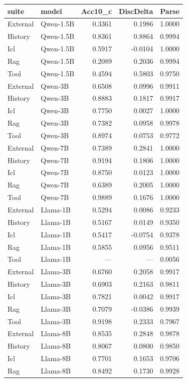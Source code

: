 \begin{tabular}{llrrr}
\toprule
suite & model & Acc10_c & DiscDelta & Parse \\
\midrule
External & Qwen-1.5B & 0.3361 & 0.1986 & 1.0000 \\
History & Qwen-1.5B & 0.8361 & 0.8864 & 0.9994 \\
Icl & Qwen-1.5B & 0.5917 & -0.0104 & 1.0000 \\
Rag & Qwen-1.5B & 0.2089 & 0.2036 & 0.9994 \\
Tool & Qwen-1.5B & 0.4594 & 0.5803 & 0.9750 \\
External & Qwen-3B & 0.6508 & 0.0996 & 0.9911 \\
History & Qwen-3B & 0.8883 & 0.1817 & 0.9917 \\
Icl & Qwen-3B & 0.7750 & 0.0027 & 1.0000 \\
Rag & Qwen-3B & 0.7382 & 0.0958 & 0.9978 \\
Tool & Qwen-3B & 0.8974 & 0.0753 & 0.9772 \\
External & Qwen-7B & 0.7389 & 0.2841 & 1.0000 \\
History & Qwen-7B & 0.9194 & 0.1806 & 1.0000 \\
Icl & Qwen-7B & 0.8750 & 0.0123 & 1.0000 \\
Rag & Qwen-7B & 0.6389 & 0.2005 & 1.0000 \\
Tool & Qwen-7B & 0.9889 & 0.1676 & 1.0000 \\
External & Llama-1B & 0.5294 & 0.0086 & 0.9233 \\
History & Llama-1B & 0.5167 & 0.0149 & 0.9350 \\
Icl & Llama-1B & 0.5417 & -0.0754 & 0.9378 \\
Rag & Llama-1B & 0.5855 & 0.0956 & 0.9511 \\
Tool & Llama-1B & --- & --- & 0.0056 \\
External & Llama-3B & 0.6760 & 0.2058 & 0.9917 \\
History & Llama-3B & 0.6903 & 0.2163 & 0.9811 \\
Icl & Llama-3B & 0.7821 & 0.0042 & 0.9917 \\
Rag & Llama-3B & 0.7079 & -0.0386 & 0.9939 \\
Tool & Llama-3B & 0.9198 & 0.2333 & 0.7967 \\
External & Llama-8B & 0.8535 & 0.2848 & 0.9878 \\
History & Llama-8B & 0.8067 & 0.0800 & 0.9850 \\
Icl & Llama-8B & 0.7701 & 0.1653 & 0.9706 \\
Rag & Llama-8B & 0.8492 & 0.1730 & 0.9928 \\

\end{tabular}
